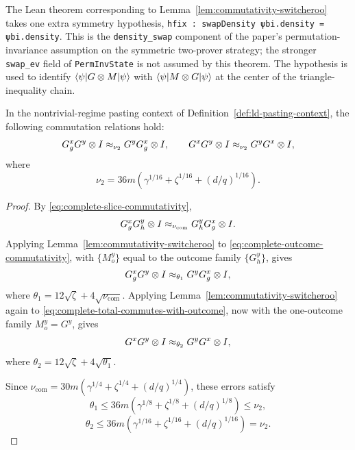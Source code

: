 \begin{remark}\label{rem:commutativity-switcheroo-density-swap}
	The Lean theorem corresponding to Lemma~\ref{lem:commutativity-switcheroo}
	takes one extra symmetry hypothesis,
	\texttt{hfix : swapDensity ψbi.density = ψbi.density}. This is the
	\texttt{density\_swap} component of the paper's permutation-invariance
	assumption on the symmetric two-prover strategy; the stronger
	\texttt{swap\_ev} field of \texttt{PermInvState} is not assumed by this
	theorem. The hypothesis is used to identify
	$\langle \psi \rvert G \otimes M \lvert \psi \rangle$ with $\langle \psi \rvert M \otimes G \lvert \psi \rangle$
	at the center of the triangle-inequality chain.
\end{remark}

\begin{corollary}\label{cor:commuting-with-G-complete}
	\leanok
	In the nontrivial-regime pasting context of Definition~\ref{def:ld-pasting-context},
	the following commutation relations hold:
	\[
		G_g^x G^y \otimes I \approx_{\nu_2} G^y G_g^x \otimes I,
		\qquad
		G^x G^y \otimes I \approx_{\nu_2} G^y G^x \otimes I,
	\]
	where
	\[
		\nu_2 = 36m\left(\gamma^{1/16}+\zeta^{1/16}+(d/q)^{1/16}\right).
	\]
\end{corollary}
\begin{proof}
	\leanok
	By \ref{eq:complete-slice-commutativity},
	\begin{equation}\label{eq:complete-outcome-commutativity}
		G_g^x G_h^y \otimes I \approx_{\nu_{\mathrm{com}}} G_h^y G_g^x \otimes I.
	\end{equation}
	Applying Lemma~\ref{lem:commutativity-switcheroo} to \ref{eq:complete-outcome-commutativity}, with $\{M_o^y\}$ equal to the outcome family $\{G_h^y\}$, gives
	\begin{equation}\label{eq:complete-total-commutes-with-outcome}
		G_g^x G^y \otimes I \approx_{\theta_1} G^y G_g^x \otimes I,
	\end{equation}
	where $\theta_1 = 12\sqrt{\zeta} + 4\sqrt{\nu_{\mathrm{com}}}$. Applying Lemma~\ref{lem:commutativity-switcheroo} again to \ref{eq:complete-total-commutes-with-outcome}, now with the one-outcome family $M_o^y = G^y$, gives
	\[
		G^x G^y \otimes I \approx_{\theta_2} G^y G^x \otimes I,
	\]
	where $\theta_2 = 12\sqrt{\zeta} + 4\sqrt{\theta_1}$.

	Since $\nu_{\mathrm{com}}=30m(\gamma^{1/4}+\zeta^{1/4}+(d/q)^{1/4})$, these errors satisfy
	\[
		\theta_1 \le 36m\left(\gamma^{1/8}+\zeta^{1/8}+(d/q)^{1/8}\right)\le \nu_2,
	\]
	\[
		\theta_2 \le 36m\left(\gamma^{1/16}+\zeta^{1/16}+(d/q)^{1/16}\right)=\nu_2.
	\]
\end{proof}

